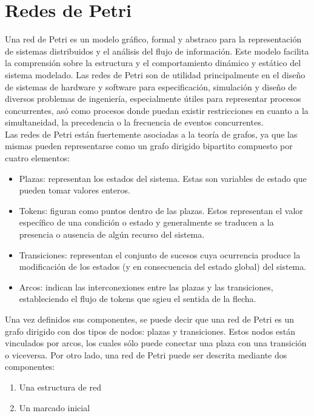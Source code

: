 \section{Redes de Petri}

Una red de Petri es un modelo gráfico, formal y abstraco para la representación de sistemas distribuidos y el análisis del flujo de información. Este modelo facilita la comprensión sobre la estructura y el comportamiento dinámico y estático del sistema modelado. Las redes de Petri son de utilidad principalmente en el diseño de sistemas de hardware y software para especificación, simulación y diseño de diversos problemas de ingeniería, especialmente útiles para representar procesos concurrentes, asó como procesos donde puedan existir restricciones en cuanto a la simultaneidad, la precedencia o la frecuencia de eventos concurrentes.\\

Las redes de Petri están fuertemente asociadas a la teoría de grafos, ya que las mismas pueden representarse como un grafo dirigido bipartito compuesto por cuatro elementos:

\begin{itemize}
    \item Plazas: representan los estados del sistema. Estas son variables de estado que pueden tomar valores enteros.
    \item Tokens: figuran como puntos dentro de las plazas. Estos representan el valor específico de una condición o estado y generalmente se traducen a la presencia o ausencia de algún recurso del sistema.
    \item Transiciones: representan el conjunto de sucesos cuya ocurrencia produce la modificación de los estados (y en consecuencia del estado global) del sistema.
    \item Arcos: indican las interconexiones entre las plazas y las transiciones, estableciendo el flujo de tokens que sgieu el sentida de la flecha.
\end{itemize}

Una vez definidos sus componentes, se puede decir que una red de Petri es un grafo dirigido con dos tipos de nodos: plazas y transiciones. Estos nodos están vinculados por arcos, los cuales sólo puede conectar una plaza con una transición o viceversa. Por otro lado, una red de Petri puede ser descrita mediante dos componentes:

\begin{enumerate}
    \item Una estructura de red
    \item Un marcado inicial
\end{enumerate}

